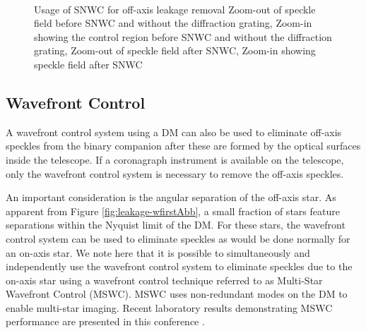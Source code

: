 \documentclass[]{spie}  %
\begin{document}
\begin{figure}[t!]
\centering
{}
\\
\caption[Companion Leakage]
{\label{fig:offAxisWC} Usage of SNWC for off-axis leakage removal  Zoom-out of speckle field before SNWC and without the diffraction grating,  Zoom-in showing the control region before SNWC and without the diffraction grating,  Zoom-out of speckle field after SNWC,   Zoom-in showing speckle field after SNWC}
\end{figure}

\subsection{Wavefront Control}

A wavefront control system using a DM can also be used to eliminate off-axis speckles from the binary companion after these are formed by the optical surfaces inside the telescope. If a coronagraph instrument is available on the telescope, only the wavefront control system is necessary to remove the off-axis speckles. 

An important consideration is the angular separation of the off-axis star. As apparent from Figure \ref{fig:leakage-wfirstAbb}, a small fraction of stars feature separations within the Nyquist limit of the DM. For these stars, the wavefront control system can be used to eliminate speckles as would be done normally for an on-axis star. We note here that it is possible to simultaneously and independently use the wavefront control system to eliminate speckles due to the on-axis star using a wavefront control technique referred to as Multi-Star Wavefront Control (MSWC). MSWC\cite{Sirbu17} uses non-redundant modes on the DM to enable multi-star imaging. Recent laboratory results demonstrating MSWC performance are presented in this conference \cite{Belikov17}.
\end{document}
